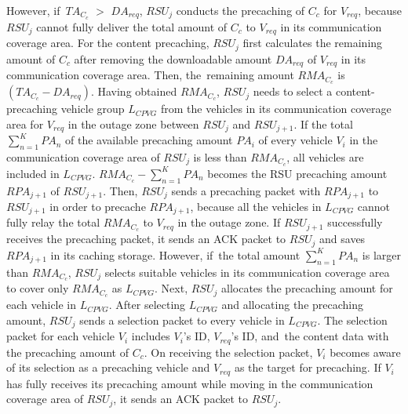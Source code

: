 \documentclass[sensors,aricle,accept,pdftex,moreauthors]{Definitions/mdpi}
\begin{document}
However, if~$TA_{C_{c}}$ $>$ $DA_{req}$, $RSU_{j}$ conducts the precaching of $C_{c}$ for $V_{req}$, because $RSU_{j}$ cannot fully deliver the total amount of $C_{c}$ to $V_{req}$ in its communication coverage area. 
For the content precaching, $RSU_{j}$ first calculates the remaining amount of $C_{c}$ after removing the downloadable amount $DA_{req}$ of $V_{req}$ in its communication coverage area.
Then, the~remaining amount $RMA_{C_{c}}$ is $(TA_{C_{c}}-DA_{req})$.
Having obtained $RMA_{C_{c}}$, $RSU_{j}$ needs to select a content-precaching vehicle group $L_{CPVG}$ from the vehicles in its communication coverage area for $V_{req}$ in the outage zone between $RSU_{j}$ and $RSU_{j+1}$.
If the total $\sum^{K}_{n=1}PA_{n}$ of the available precaching amount $PA_{i}$ of every vehicle $V_{i}$ in the communication coverage area of $RSU_{j}$ is less than $RMA_{C_{c}}$, all vehicles are included in $L_{CPVG}$.
$RMA_{C_{c}} - \sum^{K}_{n=1}PA_{n}$ becomes the RSU precaching amount $RPA_{j+1}$ of $RSU_{j+1}$.
Then, $RSU_{j}$ sends a precaching packet with $RPA_{j+1}$ to $RSU_{j+1}$ in order to precache $RPA_{j+1}$, because all the vehicles in $L_{CPVG}$ cannot fully relay the total $RMA_{C_{c}}$ to $V_{req}$ in the outage zone.
If $RSU_{j+1}$ successfully receives the precaching packet, it sends an ACK packet to $RSU_{j}$ and saves $RPA_{j+1}$ in its caching storage.
However, if~the total amount $\sum^{K}_{n=1}PA_{n}$ is larger than $RMA_{C_{c}}$, $RSU_{j}$ selects suitable vehicles in its communication coverage area to cover only $RMA_{C_{c}}$ as $L_{CPVG}$. 
Next, $RSU_{j}$ allocates the precaching amount for each vehicle in $L_{CPVG}$.
After selecting $L_{CPVG}$ and allocating the precaching amount, $RSU_{j}$ sends a selection packet to every vehicle in $L_{CPVG}$.
The selection packet for each vehicle $V_{i}$ includes $V_{i}$'s ID, $V_{req}$'s ID, and~the content data with the precaching amount of $C_{c}$.
On receiving the selection packet, $V_{i}$ becomes aware of its selection as a precaching vehicle and $V_{req}$ as the target for precaching.
If $V_{i}$ has fully receives its precaching amount while moving in the communication coverage area of $RSU_{j}$, it sends an ACK packet to $RSU_{j}$. 
\end{document}
